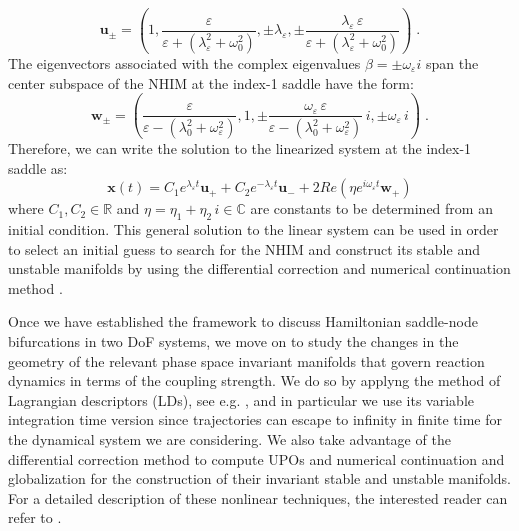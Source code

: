 \documentclass[8pt]{article}
\begin{document}
\begin{equation}
\mathbf{u}_{\pm} = \left(1,\frac{\varepsilon}{\varepsilon + \left(\lambda^2_\varepsilon + \omega^2_0\right)},\pm\lambda_{\varepsilon},\pm\frac{\lambda_{\varepsilon} \, \varepsilon}{\varepsilon + \left(\lambda^2_\varepsilon + \omega^2_0\right)}\right) \;.
\label{eq:saddle_eigenv}
\end{equation}
The eigenvectors associated with the complex eigenvalues $\beta = \pm \omega_\varepsilon i$ span the center subspace of the NHIM at the index-1 saddle have the form:
\begin{equation}
\mathbf{w}_{\pm} = \left(\frac{\varepsilon}{\varepsilon - \left(\lambda^2_0 + \omega^2_\varepsilon\right)},1,\pm\frac{\omega_{\varepsilon} \, \varepsilon}{\varepsilon - \left(\lambda^2_0 + \omega^2_\varepsilon\right)}\, i,\pm\omega_{\varepsilon}\, i\right) \;.
\label{eq:center_eigenv}
\end{equation}
Therefore, we can write the solution to the linearized system at the index-1 saddle as:
\begin{equation}
\mathbf{x}(t) = C_1 e^{\lambda_\varepsilon t} \mathbf{u}_{+} + C_2 e^{-\lambda_\varepsilon t} \mathbf{u}_{-} + 2 Re\left(\eta e^{i\omega_\varepsilon t} \mathbf{w}_{+}\right)
\label{eq:geneq_lin_ham}
\end{equation}
where $C_1,C_2 \in \mathbb{R}$ and $\eta = \eta_1 + \eta_2 \, i \in \mathbb{C}$ are constants to be determined from an initial condition. This general solution to the linear system can be used in order to select an initial guess to search for the NHIM and construct its stable and unstable manifolds by using the differential correction and numerical continuation method \cite{Koon2011,naik2017geometry,naik2019b,GG2019}. 

\smallskip

Once we have established the framework to discuss Hamiltonian saddle-node bifurcations in two DoF systems, we move on to study the changes in the geometry of the relevant phase space invariant manifolds that govern reaction dynamics in terms of the coupling strength. We do so by applyng the method of Lagrangian descriptors (LDs), see e.g. \cite{mancho2013lagrangian,lopesino2017}, and in particular we use its variable integration time version \cite{junginger2017chemical,naik2019b,GG2019} since trajectories can escape to infinity in finite time for the dynamical system we are considering. We also take advantage of the differential correction method to compute UPOs and numerical continuation and globalization for the construction of their invariant stable and unstable manifolds. For a detailed description of these nonlinear techniques, the interested reader can refer to \cite{Koon2011,naik2017geometry,naik2019b,GG2019}.
\end{document}
